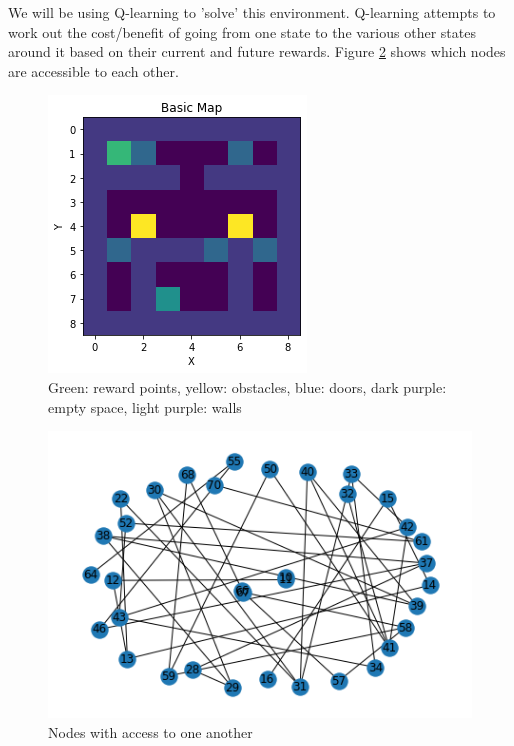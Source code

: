 \documentclass[a4pape, 11pt, english]{article}
\begin{document}
We will be using Q-learning to 'solve' this environment. Q-learning attempts to work out the cost/benefit of going from one state to the various other states around it based on their current and future rewards. Figure \ref{fig:basic_map_graph} shows which nodes are accessible to each other.

\begin{figure}[h!]
	\begin{center}
		\includegraphics{img/basic_map.png}
		\caption{Green: reward points, yellow: obstacles, blue: doors, dark purple: empty space, light purple: walls}
		\label{fig:basic_map}
	\end{center}
\end{figure}

\begin{figure}[h!]
	\begin{center}
		\includegraphics[scale=0.5]{img/basic_map_graph.png}
		\caption{Nodes with access to one another}
		\label{fig:basic_map_graph}
	\end{center}
\end{figure}
\end{document}
